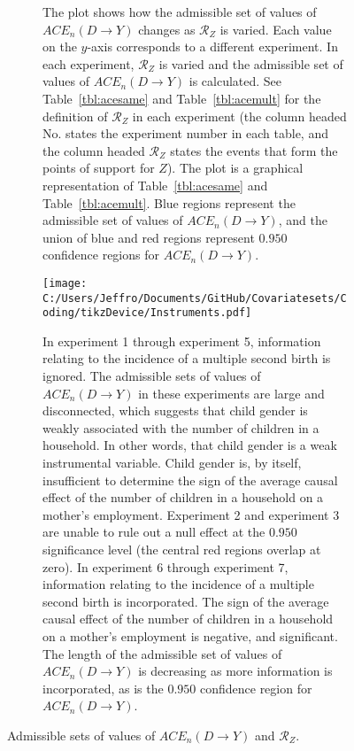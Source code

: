 \documentclass[10pt,a4paper,twoside]{article}
\numberwithin{equation}{section}
\begin{document}
\begin{figure}[p]
\centering
\begin{subfigure}{0.8\textwidth}
\caption{The plot shows how the admissible set of values of $ACE_n(D\rightarrow Y)$ changes as $\mathcal{R}_Z$ is varied. Each value on the $y$-axis corresponds to a different experiment. In each experiment, $\mathcal{R}_Z$ is varied and the admissible set of values of $ACE_n(D\rightarrow Y)$ is calculated. See Table~\ref{tbl:acesame} and Table~\ref{tbl:acemult} for the definition of $\mathcal{R}_Z$ in each experiment (the column headed No. states the experiment number in each table, and the column headed $\mathcal{R}_Z$ states the events that form the points of support for $Z$). The plot is a graphical representation of Table~\ref{tbl:acesame} and Table~\ref{tbl:acemult}. Blue regions represent the admissible set of values of $ACE_n(D\rightarrow Y)$, and the union of blue and red regions represent $0.950$ confidence regions for $ACE_n(D\rightarrow Y)$.}
\texttt{[image: C:/Users/Jeffro/Documents/GitHub/Covariatesets/Coding/tikzDevice/Instruments.pdf]}
\caption{In experiment 1 through experiment 5, information relating to the incidence of a multiple second birth is ignored. The admissible sets of values of $ACE_n(D\rightarrow Y)$ in these experiments are large and disconnected, which suggests that child gender is weakly associated with the number of children in a household. In other words, that child gender is a weak instrumental variable. Child gender is, by itself, insufficient to determine the sign of the average causal effect of the number of children in a household on a mother's employment. Experiment 2 and experiment 3 are unable to rule out a null effect at the $0.950$ significance level (the central red regions overlap at zero). In experiment 6 through experiment 7, information relating to the incidence of a multiple second birth is incorporated. The sign of the average causal effect of the number of children in a household on a mother's employment is negative, and significant. The length of the admissible set of values of $ACE_n(D\rightarrow Y)$ is decreasing as more information is incorporated, as is the $0.950$ confidence region for $ACE_n(D\rightarrow Y)$.}
\end{subfigure}
\caption{Admissible sets of values of $ACE_n(D\rightarrow Y)$ and $\mathcal{R}_Z$.}
\label{fig:experiments}
\end{figure}
\end{document}
